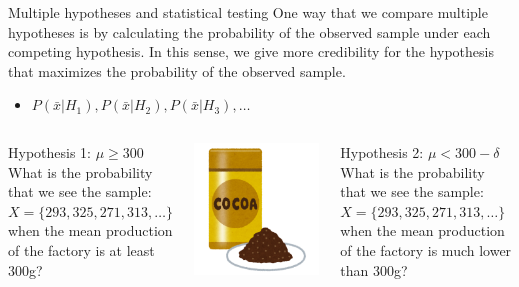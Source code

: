 \begin{frame}{Multiple hypotheses and statistical testing}
  One way that we compare multiple hypotheses is by calculating the probability of the observed sample under each competing hypothesis. In this sense, we give more credibility for the hypothesis that maximizes the probability of the observed sample.\bigskip

  \begin{itemize}
    \item $P(\bar{x}|H_1), P(\bar{x}|H_2), P(\bar{x}|H_3), \ldots$
  \end{itemize}\bigskip

  \begin{columns}
    \begin{block}{Hypothesis 1: $\mu \geq 300$}
      What is the probability that we see the sample: $X = \{293, 325, 271, 313, \ldots\}$ when the mean production of the factory is at least 300g?
    \end{block}
    \includegraphics[width=\textwidth]{../img/irasutoya_cocoa}
    \begin{block}{Hypothesis 2: $\mu < 300 - \delta$}
      What is the probability that we see the sample: $X= \{293, 325, 271, 313, \ldots\}$ when the mean production of the factory is much lower than 300g?
    \end{block}
  \end{columns}

\end{frame}



